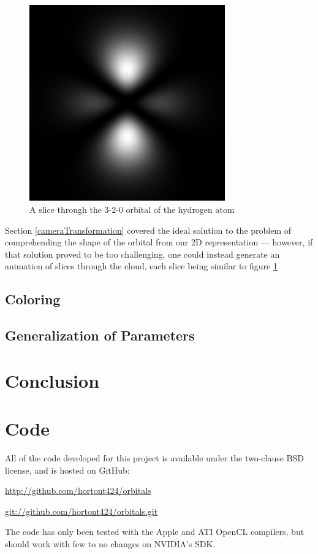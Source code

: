 \documentclass{acmsiggraph}
\begin{document}
\begin{figure}
    \includegraphics[width=84.5mm]{320-slice.png}
    \caption{A slice through the 3-2-0 orbital of the hydrogen atom}
    \label{fig:slice}
\end{figure}

Section \ref{cameraTransformation} covered the ideal solution to the problem of comprehending the shape of the orbital from our 2D representation --- however, if that solution proved to be too challenging, one could instead generate an animation of slices through the cloud, each slice being similar to figure \ref{fig:slice}

\subsection{Coloring}

\subsection{Generalization of Parameters}

\section{Conclusion}

\section{Code}

All of the code developed for this project is available under the two-clause BSD license, and is hosted on GitHub:

\url{http://github.com/hortont424/orbitals}

\url{git://github.com/hortont424/orbitals.git}

The code has only been tested with the Apple and ATI OpenCL compilers, but should work with few to no changes on NVIDIA's SDK.


\nocite{*}

\end{document}
